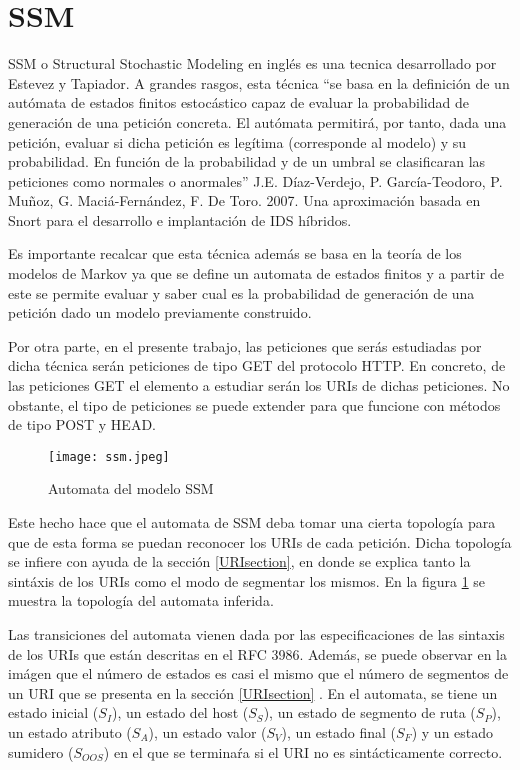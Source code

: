 \section{SSM}\label{sec:modeloSSM}

SSM o Structural Stochastic Modeling en ingl\'es es una tecnica desarrollado por Estevez y Tapiador. A grandes rasgos, esta t\'ecnica “se basa en la definición de un autómata de estados finitos estocástico capaz de evaluar la probabilidad de generación de una petición concreta. El autómata permitirá, por tanto, dada una petición, evaluar si dicha petición es legítima (corresponde al modelo) y su probabilidad. En función de la probabilidad y de un umbral se clasificaran las peticiones como normales o anormales” J.E. Díaz-Verdejo, P. García-Teodoro, P. Muñoz, G. Maciá-Fernández, F. De Toro. 2007. Una aproximación basada en Snort para el desarrollo e implantación de IDS híbridos.

Es importante recalcar que esta t\'ecnica adem\'as se basa en la teor\'ia de los modelos de Markov ya que se define un automata de estados finitos y a partir de este se permite evaluar y saber cual es la probabilidad de generaci\'on de una petici\'on dado un modelo previamente construido.

Por otra parte, en el presente trabajo, las peticiones que ser\'as estudiadas por dicha t\'ecnica ser\'an peticiones de tipo GET del protocolo HTTP. En concreto, de las peticiones GET el elemento a estudiar ser\'an los URIs de dichas peticiones. No obstante, el tipo de peticiones se puede extender para que funcione con m\'etodos de tipo POST y HEAD. 

\begin{figure}

  \texttt{[image: ssm.jpeg]}
  \caption{Automata del modelo SSM}
  \label{fig:ssm}

\end{figure}

Este hecho hace que el automata de SSM deba tomar una cierta topolog\'ia para que de esta forma se puedan reconocer los URIs de cada petici\'on. Dicha topolog\'ia se infiere con ayuda de la sección \ref{URIsection}, en donde se explica tanto la sint\'axis de los URIs como el modo de segmentar los mismos. En la figura \ref{fig:ssm} se muestra la topolog\'ia del automata inferida.

Las transiciones del automata vienen dada por las especificaciones de las sintaxis de los URIs que est\'an descritas en el RFC 3986. Adem\'as, se puede observar en la im\'agen que el n\'umero de estados es casi el mismo que el n\'umero de segmentos de un URI que se presenta en la secci\'on \ref{URIsection} . En el automata, se tiene un estado inicial ($S_{I}$), un estado del host ($S_{S}$), un estado de segmento de ruta ($S_{P}$), un estado atributo ($S_{A}$), un estado valor ($S_{V}$), un estado final ($S_{F}$) y un estado sumidero ($S_{OOS}$) en el que se termina\'ra si el URI no es sint\'acticamente correcto.

